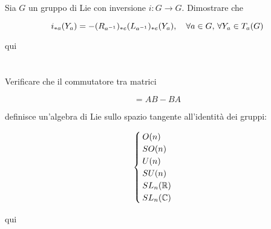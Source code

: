 %

\newpage

%

\section{}\label{es3-8}

\begin{tcolorbox}
	Sia $ G $ un gruppo di Lie con inversione $ i : G \to G $. Dimostrare che
	
	\begin{equation}
		i_{*a}(Y_{a}) = -(R_{a^{-1}})_{*e}(L_{a^{-1}})_{*e} (Y_{a}) \qcomma \forall a \in G, \, \forall Y_{a} \in T_{a}(G)
	\end{equation}
\end{tcolorbox}

qui

%

\newpage

%

\section{}\label{es3-9}

\begin{tcolorbox}
	Verificare che il commutatore tra matrici
	
	\begin{equation}
		[A,B] = AB - BA
	\end{equation}
	
	definisce un'algebra di Lie sullo spazio tangente all'identità dei gruppi:
	
	\begin{equation}
		\begin{cases}
			O(n)\\
			SO(n)\\
			U(n)\\
			SU(n)\\
			SL_{n}(\mathbb{R})\\
			SL_{n}(\mathbb{C})
		\end{cases}
	\end{equation}
\end{tcolorbox}

qui

%

\newpage

%

\section{}\label{es3-10}

